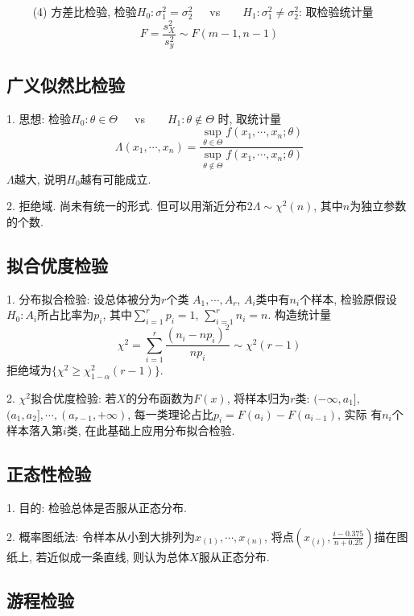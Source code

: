 ~~~~ (4) 方差比检验, 检验$H_0:\sigma_1^2 =\sigma_2^2$~~~vs~~~~$H_1:\sigma_1^2 \neq \sigma_2^2$: 取检验统计量
\begin{equation*}
    F=\frac{s_X^2}{s_y^2} \sim F(m-1,n-1)
\end{equation*}

\subsection{广义似然比检验}

1. 思想: 检验$H_0:\theta \in \Theta$~~~vs~~~~$H_1:\theta \notin \Theta$ 时, 取统计量
\begin{equation*}
    \Lambda(x_1,\cdots,x_n)=\frac{\sup\limits_{\theta \in \Theta} f(x_1,\cdots,x_n;\theta)}{\sup\limits_{\theta \notin \Theta} f(x_1,\cdots,x_n;\theta)}
\end{equation*}
$\Lambda$越大, 说明$H_0$越有可能成立.

2. 拒绝域. 尚未有统一的形式. 但可以用渐近分布$2\Lambda \sim \chi^2(n)$, 其中$n$为独立参数的个数.

\subsection{拟合优度检验}

1. 分布拟合检验: 设总体被分为$r$个类 $A_1,\cdots,A_r$, $A_i$类中有$n_i$个样本, 检验原假设$H_0:A_i$所占比率为$p_i$, 其中$\sum\limits_{i=1}^r p_i=1$, $\sum\limits_{i=1}^r n_i=n$. 构造统计量
\begin{equation*}
    \chi^2=\sum\limits_{i=1}^r \frac{(n_i-np_i)^2}{np_i} \sim \chi^2(r-1)
\end{equation*}
拒绝域为$\{\chi^2 \geq \chi^2_{1-\alpha}(r-1)\}$.

2. $\chi^2$拟合优度检验: 若$X$的分布函数为$F(x)$, 将样本归为$r$类: $(-\infty,a_1],$ $(a_1,a_2], \cdots,(a_{r-1},+\infty)$, 每一类理论占比$p_i=F(a_i)-F(a_{i-1})$, 实际
有$n_i$个样本落入第$i$类, 在此基础上应用分布拟合检验.

\subsection{正态性检验}

1. 目的: 检验总体是否服从正态分布.

2. 概率图纸法: 令样本从小到大排列为$x_{(1)},\cdots,x_{(n)}$, 将点$\left(x_{(i)},\frac{i-0.375}{n+0.25}\right)$描在图纸上, 若近似成一条直线, 则认为总体$X$服从正态分布.

\subsection{游程检验}

